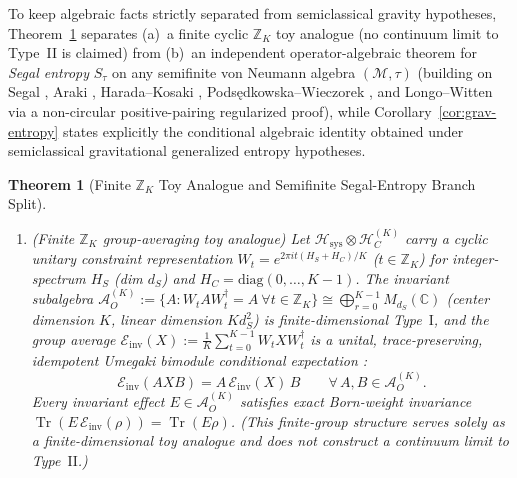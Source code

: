 \documentclass[11pt,a4paper]{article}
\newtheorem{theorem}{Theorem}
\theoremstyle{definition}
\theoremstyle{remark}
\newcommand{\Tr}{\operatorname{Tr}}
\newcommand{\cH}{\mathcal{H}}
\newcommand{\cA}{\mathcal{A}}
\newcommand{\cE}{\mathcal{E}}
\newcommand{\cM}{\mathcal{M}}
\newcommand{\bbC}{\mathbb{C}}
\newcommand{\bbZ}{\mathbb{Z}}
\newcommand{\1}{\mathbf{1}}
\begin{document}
To keep algebraic facts strictly separated from semiclassical gravity hypotheses, Theorem~\ref{thm:type2-clock} separates (a)~a finite cyclic $\bbZ_K$ toy analogue (no continuum limit to Type~II is claimed) from (b)~an independent operator-algebraic theorem for \emph{Segal entropy} $S_\tau$ on any semifinite von Neumann algebra $(\cM,\tau)$ (building on Segal \cite{Segal1960}, Araki \cite{Araki1976,Araki1977}, Harada--Kosaki \cite{HaradaKosaki2010}, Pods\k{e}dkowska--Wieczorek \cite{PodsedkowskaWieczorek2017}, and Longo--Witten \cite{LongoWitten2023} via a non-circular positive-pairing regularized proof), while Corollary~\ref{cor:grav-entropy} states explicitly the conditional algebraic identity obtained under semiclassical gravitational generalized entropy hypotheses.

\begin{theorem}[Finite $\bbZ_K$ Toy Analogue and Semifinite Segal-Entropy Branch Split]\label{thm:type2-clock}
\leavevmode
\begin{enumerate}
  \item[(a)] \emph{(Finite $\bbZ_K$ group-averaging toy analogue)} Let $\cH_{\mathrm{sys}}\otimes\cH_C^{(K)}$ carry a cyclic unitary constraint representation $W_t = e^{2\pi i t(H_S+H_C)/K}$ ($t\in\bbZ_K$) for integer-spectrum $H_S$ (dim $d_S$) and $H_C=\mathrm{diag}(0,\dots,K-1)$. The invariant subalgebra $\cA_O^{(K)}:=\{A : W_t A W_t^\dagger = A\ \forall t\in\bbZ_K\}\cong\bigoplus_{r=0}^{K-1} M_{d_S}(\bbC)$ (center dimension $K$, linear dimension $K d_S^2$) is finite-dimensional Type~$\mathrm{I}$, and the group average $\cE_{\mathrm{inv}}(X):=\frac{1}{K}\sum_{t=0}^{K-1}W_t X W_t^\dagger$ is a unital, trace-preserving, idempotent Umegaki bimodule conditional expectation \cite{Umegaki1954}:
  \begin{equation}\label{eq:bimodule}
    \cE_{\mathrm{inv}}(A X B) = A\,\cE_{\mathrm{inv}}(X)\,B \qquad \forall\, A,B\in\cA_O^{(K)}.
  \end{equation}
  Every invariant effect $E\in\cA_O^{(K)}$ satisfies exact Born-weight invariance $\Tr(E\,\cE_{\mathrm{inv}}(\rho))=\Tr(E\rho)$. (This finite-group structure serves solely as a finite-dimensional toy analogue and does not construct a continuum limit to Type~$\mathrm{II}$.)

\end{enumerate}
\end{theorem}
\end{document}
